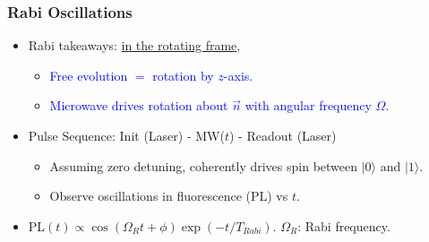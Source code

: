 \documentclass{beamer}
\begin{document}
\begin{frame}
\frametitle{Rabi Oscillations}
\begin{itemize}
    \item Rabi takeaways: \underline{in the rotating frame}, 
    \begin{itemize}
        \item \textcolor{blue}{Free evolution $=$ rotation by $z$-axis.} 
        \item \textcolor{blue}{Microwave drives rotation about $\vec{n}$ with angular frequency $\Omega$.} 
    \end{itemize}
    \item Pulse Sequence: Init (Laser) - MW($t$) - Readout (Laser)
    \begin{itemize}
        \item Assuming zero detuning, coherently drives spin between $|0\rangle$ and $|1\rangle$. 
        \item Observe oscillations in fluorescence (PL) vs $t$.
    \end{itemize}
    \item PL$(t) \propto \cos(\Omega_R t + \phi) \exp(-t/T_{Rabi})$. $\Omega_R$: Rabi frequency.
\end{itemize}

\end{frame}
\end{document}
